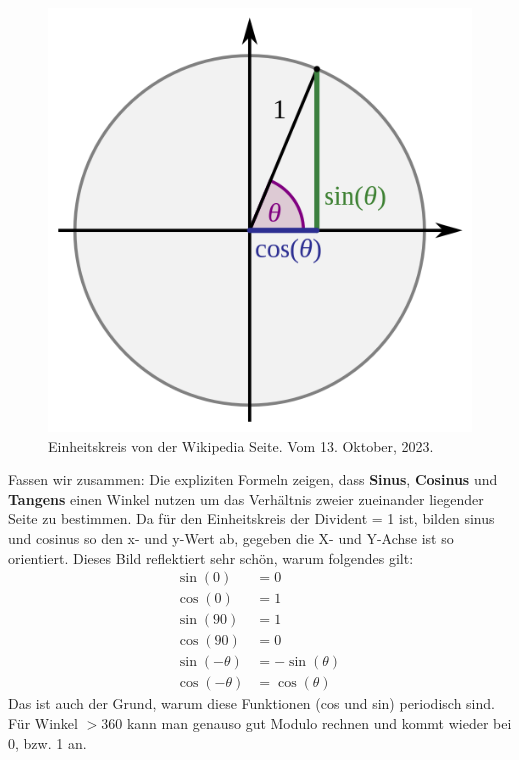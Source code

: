 \documentclass[letterpaper, titlepage]{article}
\begin{document}
 \begin{figure}[h]
    \begin{center}    
        \includegraphics[scale=0.32]{Bilder/Sinus_und_Kosinus_am_Einheitskreis_1.svg.png}
        \caption{Einheitskreis von der Wikipedia Seite. Vom 13. Oktober, 2023.}
    \end{center}
    \label{Einheitskreis_Bild}
\end{figure} \hfill \break
Fassen wir zusammen: Die expliziten Formeln zeigen, dass \textbf{Sinus}, \textbf{Cosinus} und \textbf{Tangens} einen Winkel nutzen um das Verhältnis zweier zueinander liegender Seite zu bestimmen. Da für den Einheitskreis der Divident = 1 ist, bilden sinus und cosinus so den x- und y-Wert ab, gegeben die X- und Y-Achse ist so orientiert. Dieses Bild reflektiert sehr schön, warum folgendes gilt:
\skiptwolines
\begin{align*}
    \sin(0) &= 0 \
    \\
    \cos(0) &= 1 \
    \\
    \sin(90) &= 1 \
    \\
    \cos(90) &= 0 \
    \\
    \sin(-\theta) &=  -\sin(\theta) \
    \\
    \cos(-\theta) &= \cos(\theta)
\end{align*}
Das ist auch der Grund, warum diese Funktionen (cos und sin) periodisch sind. Für Winkel $> 360$ kann man genauso gut Modulo rechnen und kommt wieder bei 0, bzw. 1 an.
\end{document}
